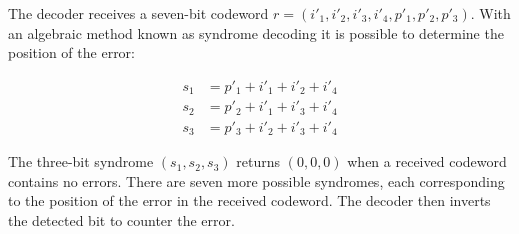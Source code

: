\documentclass[../main.tex]{subfiles}
\begin{document}
    The decoder receives a seven-bit codeword $r=(i'_1, i'_2, i'_3, i'_4, p'_1, p'_2, p'_3)$. With an algebraic method known as syndrome decoding it is possible to determine the position of the error:

    \begin{align*}
        s_1 &= p'_1 + i'_1 + i'_2 + i'_4\\
        s_2 &= p'_2 + i'_1 + i'_3 + i'_4\\
        s_3 &= p'_3 + i'_2 + i'_3 + i'_4
    \end{align*}

    \noindent
    The three-bit syndrome $(s_1, s_2, s_3)$ returns $(0, 0, 0)$ when a received codeword contains no errors. There are seven more possible syndromes, each corresponding to the position of the error in the received codeword. The decoder then inverts the detected bit to counter the error.

    \newpage
\end{document}
